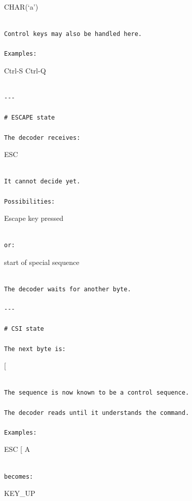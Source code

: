 \documentclass[
  oneside,
  openany]{book}
\begin{document}
CHAR(`a')

\begin{verbatim}

Control keys may also be handled here.

Examples:
\end{verbatim}

Ctrl-S Ctrl-Q

\begin{verbatim}

---

# ESCAPE state

The decoder receives:
\end{verbatim}

ESC

\begin{verbatim}

It cannot decide yet.

Possibilities:
\end{verbatim}

Escape key pressed

\begin{verbatim}

or:
\end{verbatim}

start of special sequence

\begin{verbatim}

The decoder waits for another byte.

---

# CSI state

The next byte is:
\end{verbatim}

{[}

\begin{verbatim}

The sequence is now known to be a control sequence.

The decoder reads until it understands the command.

Examples:
\end{verbatim}

ESC {[} A

\begin{verbatim}

becomes:
\end{verbatim}

KEY\_UP

\begin{verbatim}
\end{verbatim}
\end{document}
